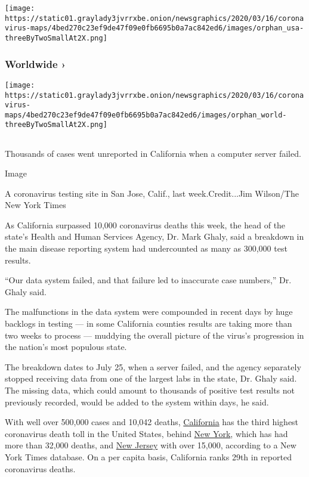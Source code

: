\texttt{[image: https://static01.graylady3jvrrxbe.onion/newsgraphics/2020/03/16/coronavirus-maps/4bed270c23ef9de47f09e0fb6695b0a7ac842ed6/images/orphan\_usa-threeByTwoSmallAt2X.png]}
\href{https://www.nytimes3xbfgragh.onion/interactive/2020/world/coronavirus-maps.html}{}

\hypertarget{worldwide-}{%
\subsubsection{Worldwide ›}\label{worldwide-}}

\texttt{[image: https://static01.graylady3jvrrxbe.onion/newsgraphics/2020/03/16/coronavirus-maps/4bed270c23ef9de47f09e0fb6695b0a7ac842ed6/images/orphan\_world-threeByTwoSmallAt2X.png]}

\hypertarget{section-2}{%
\subsection{}\label{section-2}}

Thousands of cases went unreported in California when a computer server
failed.

Image

A coronavirus testing site in San Jose, Calif., last week.Credit...Jim
Wilson/The New York Times

As California surpassed 10,000 coronavirus deaths this week, the head of
the state's Health and Human Services Agency, Dr. Mark Ghaly, said a
breakdown in the main disease reporting system had undercounted as many
as 300,000 test results.

``Our data system failed, and that failure led to inaccurate case
numbers,'' Dr. Ghaly said.

The malfunctions in the data system were compounded in recent days by
huge backlogs in testing --- in some California counties results are
taking more than two weeks to process --- muddying the overall picture
of the virus's progression in the nation's most populous state.

The breakdown dates to July 25, when a server failed, and the agency
separately stopped receiving data from one of the largest labs in the
state, Dr. Ghaly said. The missing data, which could amount to thousands
of positive test results not previously recorded, would be added to the
system within days, he said.

With well over 500,000 cases and 10,042 deaths,
\href{https://www.nytimes3xbfgragh.onion/interactive/2020/us/california-coronavirus-cases.html}{California}
has the third highest coronavirus death toll in the United States,
behind
\href{https://www.nytimes3xbfgragh.onion/interactive/2020/us/new-york-coronavirus-cases.html}{New
York}, which has had more than 32,000 deaths, and
\href{https://www.nytimes3xbfgragh.onion/interactive/2020/us/new-jersey-coronavirus-cases.html}{New
Jersey} with over 15,000, according to a New York Times database. On a
per capita basis, California ranks 29th in reported coronavirus deaths.

